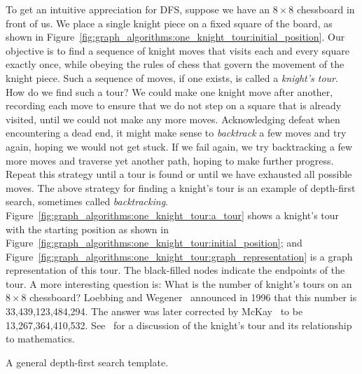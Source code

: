 To get an intuitive appreciation for DFS, suppose we have
an $8 \times 8$ chessboard in front of us. We
place a single knight piece on a fixed
square of the board, as shown in
Figure~\ref{fig:graph_algorithms:one_knight_tour:initial_position}. Our
objective is to find a sequence of knight
moves that visits each and every square exactly once, while obeying
the rules of chess that govern the movement of the knight
piece. Such a sequence of moves, if one
exists, is called a \emph{knight's tour}. How do
we find such a tour? We could make one knight move
after another, recording each move to ensure that we do not step on a
square that is already visited, until we could not make any more
moves. Acknowledging defeat when encountering a dead end, it might
make sense to \emph{backtrack} a few moves and try
again, hoping we would not get stuck. If we fail again, we try
backtracking a few more moves and traverse yet
another path, hoping to make further progress. Repeat this strategy
until a tour is found or until we have exhausted all possible
moves. The above strategy for finding a knight's
tour is an example of depth-first
search, sometimes called
\emph{backtracking}. Figure~\ref{fig:graph_algorithms:one_knight_tour:a_tour}
shows a knight's tour with the starting position as shown in
Figure~\ref{fig:graph_algorithms:one_knight_tour:initial_position};
and
Figure~\ref{fig:graph_algorithms:one_knight_tour:graph_representation}
is a graph representation of this tour. The black-filled nodes
indicate the endpoints of the tour. A more interesting question is:
What is the number of knight's tours on an $8 \times 8$ chessboard?
Loebbing and
Wegener~\cite{LoebbingWegener1996} announced in
1996 that this number is 33,439,123,484,294. The answer was later
corrected by McKay~\cite{McKay1997} to be
13,267,364,410,532. See~\cite{ElkiesStanley2003}
for a discussion of
the knight's tour and its relationship to mathematics.

\begin{algorithm}[!htbp]

\caption{A general depth-first search template.}
\label{alg:graph_algorithms:depth_first_search_template}
\end{algorithm}

